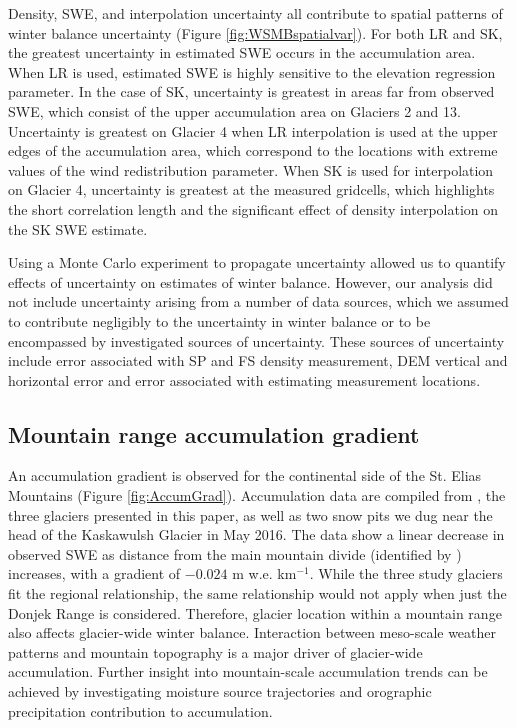 \documentclass[twocolumn, letterpaper]{igs}
\begin{document}
Density, SWE, and interpolation uncertainty all contribute to spatial patterns of winter balance uncertainty (Figure \ref{fig:WSMBspatialvar}). For both LR and SK, the greatest uncertainty in estimated SWE occurs in the accumulation area. When LR is used, estimated SWE is highly sensitive to the elevation regression parameter. In the case of SK, uncertainty is greatest in areas far from observed SWE, which consist of the upper accumulation area on Glaciers 2 and 13. Uncertainty is greatest on Glacier 4 when LR interpolation is used at the upper edges of the accumulation area, which correspond to the locations with extreme values of the wind redistribution parameter. When SK is used for interpolation on Glacier 4, uncertainty is greatest at the measured gridcells, which highlights the short correlation length and the significant effect of density interpolation on the SK SWE estimate.

Using a Monte Carlo experiment to propagate uncertainty allowed us to quantify effects of uncertainty on estimates of winter balance. However, our analysis did not include uncertainty arising from a number of data sources, which we assumed to contribute negligibly to the uncertainty in winter balance or to be encompassed by investigated sources of uncertainty. These sources of uncertainty include error associated with SP and FS density measurement, DEM vertical and horizontal error and error associated with estimating measurement locations.


\subsection{Mountain range accumulation gradient}

An accumulation gradient is observed for the continental side of the St. Elias Mountains (Figure \ref{fig:AccumGrad}). Accumulation data are compiled from \cite{Taylor1969}, the three glaciers presented in this paper, as well as two snow pits we dug near the head of the Kaskawulsh Glacier in May 2016. The data show a linear decrease in observed SWE as distance from the main mountain divide (identified by \cite{Taylor1969}) increases, with a gradient of $-0.024$ m w.e. km$^{-1}$. While the three study glaciers fit the regional relationship, the same relationship would not apply when just the Donjek Range is considered. Therefore, glacier location within a mountain range also affects glacier-wide winter balance. Interaction between meso-scale weather patterns and mountain topography is a major driver of glacier-wide accumulation. Further insight into mountain-scale accumulation trends can be achieved by investigating moisture source trajectories and orographic precipitation contribution to accumulation. 
\end{document}
